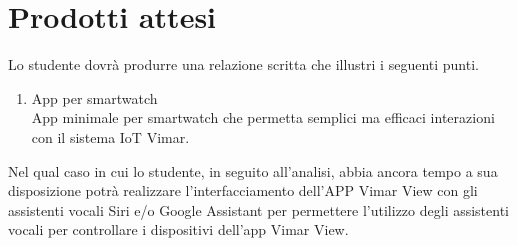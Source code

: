 \section*{Prodotti attesi}
Lo studente dovrà produrre una relazione scritta che illustri i seguenti punti.
\begin{enumerate}
    \item App per smartwatch \\
    App minimale per smartwatch che permetta semplici ma efficaci interazioni con il sistema IoT Vimar. 
\end{enumerate}
Nel qual caso in cui lo studente, in seguito all'analisi, abbia ancora tempo a sua disposizione potrà realizzare l'interfacciamento dell’APP Vimar View con gli assistenti vocali Siri e/o Google Assistant per permettere l'utilizzo degli assistenti vocali per controllare i dispositivi dell'app Vimar View.
